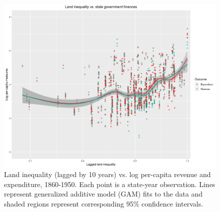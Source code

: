 \documentclass[12pt]{article}
\begin{document}
\begin{figure}[htbp]
	\begin{center}
		\includegraphics[width=1\textwidth]{plots/ineq-capacity.png} 
	\end{center}
	\caption{Land inequality (lagged by 10 years) vs. log per-capita revenue and expenditure, 1860-1950. Each point is a state-year observation. Lines represent generalized additive model (GAM) fits to the data and shaded regions represent corresponding 95\% confidence intervals.   \label{fig:ineq-capacity}}
\end{figure} 

\pagebreak





\itemize
\end{document}
